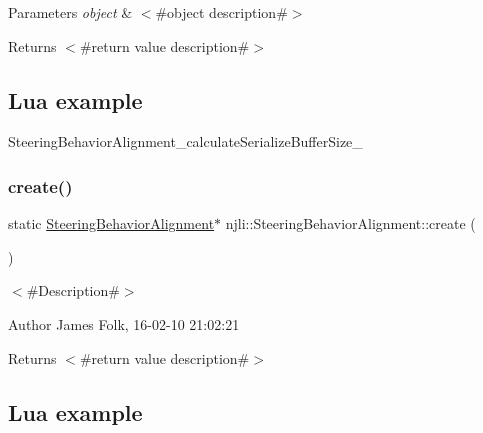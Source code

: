 \begin{DoxyParams}{Parameters}
{\em object} & $<$\#object description\#$>$\\
\hline
\end{DoxyParams}
\begin{DoxyReturn}{Returns}
$<$\#return value description\#$>$
\end{DoxyReturn}
\hypertarget{classnjli_1_1_steering_behavior_wander_ex1}{}\subsection{Lua example}\label{classnjli_1_1_steering_behavior_wander_ex1}

\begin{DoxyCodeInclude}
\end{DoxyCodeInclude}
Steering\+Behavior\+Alignment\+\_\+calculate\+Serialize\+Buffer\+Size\+\_\+ \mbox{\label{classnjli_1_1_steering_behavior_alignment_a4aeea58e195226f38b2e8d22f54d01aa}} 
\subsubsection{\texorpdfstring{create()}{create()}\hspace{0.1cm}{\footnotesize\ttfamily [1/2]}}
{\footnotesize\ttfamily static \mbox{\hyperlink{classnjli_1_1_steering_behavior_alignment}{Steering\+Behavior\+Alignment}}$\ast$ njli\+::\+Steering\+Behavior\+Alignment\+::create (\begin{DoxyParamCaption}{ }\end{DoxyParamCaption})\hspace{0.3cm}{\ttfamily [static]}}



$<$\#\+Description\#$>$ 

\begin{DoxyAuthor}{Author}
James Folk, 16-\/02-\/10 21\+:02\+:21
\end{DoxyAuthor}
\begin{DoxyReturn}{Returns}
$<$\#return value description\#$>$
\end{DoxyReturn}
\hypertarget{classnjli_1_1_steering_behavior_wander_ex1}{}\subsection{Lua example}\label{classnjli_1_1_steering_behavior_wander_ex1}


